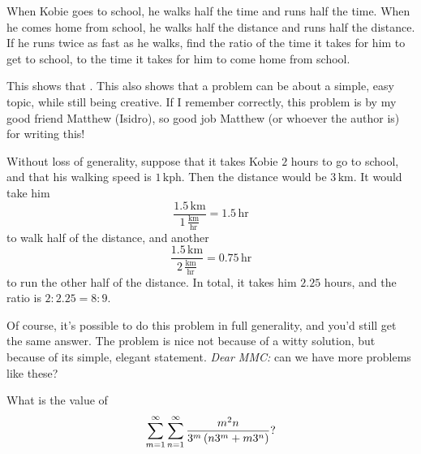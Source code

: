 \documentclass[11pt,paper=letter]{scrartcl}
\begin{document}
\begin{probboxed}
   When Kobie goes to school, he walks half the time and runs half the time. When he comes home from school, he walks half the distance and runs half the distance. If he runs twice as fast as he walks, find the ratio of the time it takes for him to get to school, to the time it takes for him to come home from school.
\end{probboxed}

This shows that . This also shows that a problem can be about a simple, easy topic, while still being creative. If I remember correctly, this problem is by my good friend Matthew (Isidro), so good job Matthew (or whoever the author is) for writing this!

Without loss of generality, suppose that it takes Kobie $2$ hours to go to school, and that his walking speed is $1\,\text{kph}$. Then the distance would be $3\,\text{km}$. It would take him $$\dfrac{1.5\,\text{km}}{1\,\frac{\text{km}}{\text{hr}}} = 1.5\,\text{hr}$$ to walk half of the distance, and another $$\dfrac{1.5\,\text{km}}{2\,\frac{\text{km}}{\text{hr}}} = 0.75\,\text{hr}$$ to run the other half of the distance. In total, it takes him $2.25$ hours, and the ratio is $2 : 2.25 = 8 : 9$.

Of course, it's possible to do this problem in full generality, and you'd still get the same answer. The problem is nice not because of a witty solution, but because of its simple, elegant statement. \emph{Dear MMC:} can we have more problems like these?

\begin{probboxed}
   What is the value of $$\sum_{m=1}^{\infty} \sum_{n=1}^{\infty} \frac{m^2n}{3^m \left( n3^m + m3^n \right)}?$$
\end{probboxed}
\end{document}
